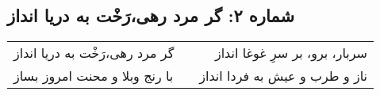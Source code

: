 \begin{center}
\section*{شماره ۲: گر مرد رهی،‌رَخْت به دریا انداز}
\label{sec:002}
\begin{longtable}{l p{0.5cm} r}
گر مرد رهی،‌رَخْت به دریا انداز
&&
سربار، برو، بر سرِ غوغا انداز
\\
با رنج وبلا و محنت امروز بساز
&&
ناز و طرب و عیش به فردا انداز
\\
\end{longtable}
\end{center}
